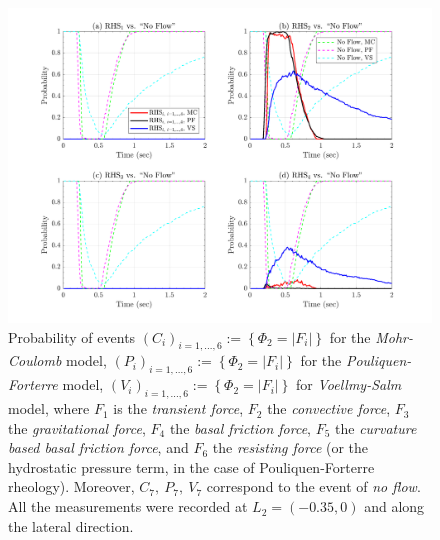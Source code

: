 \documentclass{article}
\begin{document}
\begin{figure}[H]
        \centering
        \includegraphics[width=1\textwidth]{InclinedPlane/Dominance1/DominancePrY_L2.png}
        \caption{Probability of events $(C_i)_{i=1,...,6}:=\left\{\Phi_2=|F_i|\right\}$ for the \emph{Mohr-Coulomb} model, $(P_i)_{i=1,...,6}:=\left\{\Phi_2=|F_i|\right\}$ for the \emph{Pouliquen-Forterre} model, $(V_i)_{i=1,...,6}:=\left\{\Phi_2=|F_i|\right\}$ for \emph{Voellmy-Salm} model, where $F_1$ is the \emph{transient force}, $F_2$ the \emph{convective force}, $F_3$ the \emph{gravitational force}, $F_4$ the \emph{basal friction force}, $F_5$ the \emph{curvature based basal friction force}, and $F_6$ the \emph{resisting force} (or the hydrostatic pressure term, in the case of Pouliquen-Forterre rheology). Moreover, $C_7,\ P_7,\ V_7$ correspond to the event of \emph{no flow}. All the measurements were recorded at $L_2=(-0.35,0)$ and along the lateral direction.}
        \label{fig:Ramp-FYDominance1-L2}
\end{figure}
\end{document}
